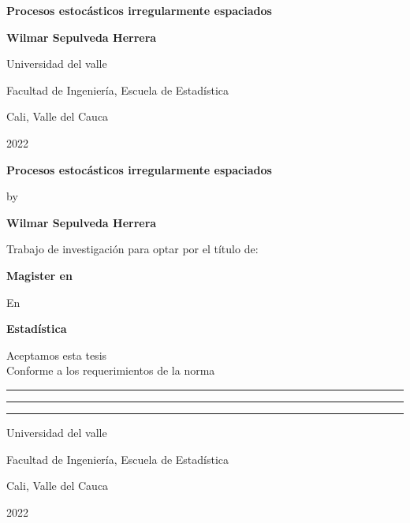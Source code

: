 \thispagestyle{empty}

\begin{center}
\begin{figure}
\centering
{}
\end{figure}\vspace*{2.0cm}

\textbf{\huge Procesos estocásticos irregularmente espaciados}\vspace*{4.0cm}

\Large\textbf{Wilmar Sepulveda Herrera}\vspace*{4.0cm}

\small Universidad del valle

Facultad de Ingeniería, Escuela de Estadística

Cali, Valle del Cauca

2022
\end{center}

\newpage{\pagestyle{empty}\cleardoublepage}

\newpage

\thispagestyle{empty}

\begin{center}
\textbf{\huge Procesos estocásticos irregularmente espaciados}\vspace*{1.0cm}

by\vspace*{0.5cm}

\Large\textbf{Wilmar Sepulveda Herrera}\vspace*{1.0cm}

\small Trabajo de investigación para optar por el título de:\vspace*{1.0cm}

\textbf{Magister en}\vspace*{0.5cm}

En\vspace*{0.5cm}

\textbf{Estadística}\vspace*{1.5cm}

Aceptamos esta tesis\\
Conforme a los requerimientos de la norma\vspace*{1.0cm}

\rule{10cm}{1pt}\vspace*{0.7cm}
\rule{10cm}{1pt}\vspace*{0.7cm}
\rule{10cm}{1pt}\vspace*{2.3cm}

\small Universidad del valle

Facultad de Ingeniería, Escuela de Estadística

Cali, Valle del Cauca

2022
\end{center}

